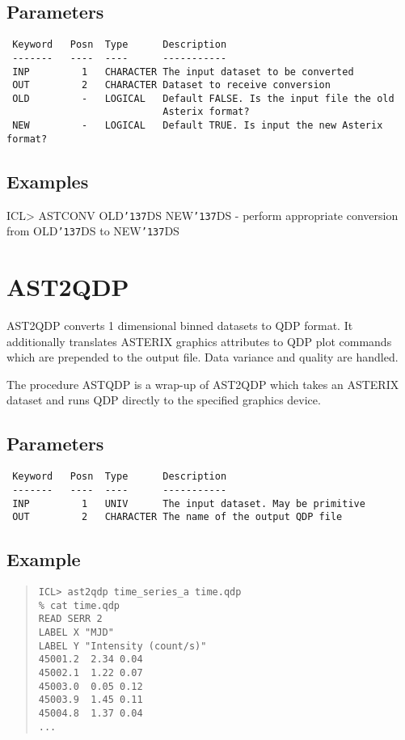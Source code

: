 \documentclass{book}
\renewcommand{\_}{{\tt\char'137}}     %
\begin{document}
\subsection{Parameters}
\begin{verbatim}
 Keyword   Posn  Type      Description
 -------   ----  ----      -----------
 INP         1   CHARACTER The input dataset to be converted
 OUT         2   CHARACTER Dataset to receive conversion
 OLD         -   LOGICAL   Default FALSE. Is the input file the old
                           Asterix format?
 NEW         -   LOGICAL   Default TRUE. Is input the new Asterix format?

\end{verbatim}\subsection{Examples}
ICL> ASTCONV OLD\_DS NEW\_DS - perform appropriate conversion
from OLD\_DS to NEW\_DS
\section{AST2QDP}
AST2QDP converts 1 dimensional binned datasets to QDP format. It
additionally translates ASTERIX graphics attributes to QDP plot
commands which are prepended to the output file. Data variance and
quality are handled.

The procedure ASTQDP is a wrap-up of AST2QDP which takes an
ASTERIX dataset and runs QDP directly to the specified graphics
device.

\subsection{Parameters}
\begin{verbatim}
 Keyword   Posn  Type      Description
 -------   ----  ----      -----------
 INP         1   UNIV      The input dataset. May be primitive
 OUT         2   CHARACTER The name of the output QDP file

\end{verbatim}\subsection{Example}
\begin{quote}\begin{verbatim}
ICL> ast2qdp time_series_a time.qdp
% cat time.qdp
READ SERR 2
LABEL X "MJD"
LABEL Y "Intensity (count/s)"
45001.2  2.34 0.04
45002.1  1.22 0.07
45003.0  0.05 0.12
45003.9  1.45 0.11
45004.8  1.37 0.04
...
\end{verbatim}\end{quote}
\end{document}
